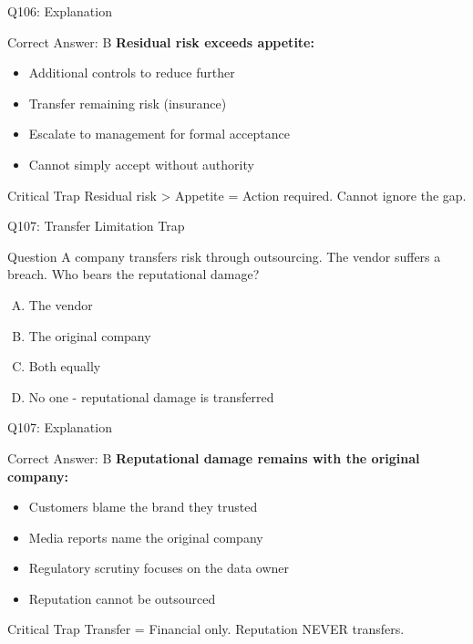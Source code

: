 \documentclass{beamer}
\begin{document}
	\begin{frame}{Q106: Explanation}
		\begin{block}{Correct Answer: B}
			\textbf{Residual risk exceeds appetite:}
			\begin{itemize}
				\item Additional controls to reduce further
				\item Transfer remaining risk (insurance)
				\item Escalate to management for formal acceptance
				\item Cannot simply accept without authority
			\end{itemize}
		\end{block}
		\begin{alertblock}{Critical Trap}
			Residual risk > Appetite = Action required.
			Cannot ignore the gap.
		\end{alertblock}
	\end{frame}
	
	\begin{frame}{Q107: Transfer Limitation Trap}
		\begin{block}{Question}
			A company transfers risk through outsourcing. The vendor suffers a breach. Who bears the reputational damage?
		\end{block}
		\begin{enumerate}[(A)]
			\item The vendor
			\item The original company
			\item Both equally
			\item No one - reputational damage is transferred
		\end{enumerate}
	\end{frame}
	
	\begin{frame}{Q107: Explanation}
		\begin{block}{Correct Answer: B}
			\textbf{Reputational damage remains with the original company:}
			\begin{itemize}
				\item Customers blame the brand they trusted
				\item Media reports name the original company
				\item Regulatory scrutiny focuses on the data owner
				\item Reputation cannot be outsourced
			\end{itemize}
		\end{block}
		\begin{alertblock}{Critical Trap}
			Transfer = Financial only.
			Reputation NEVER transfers.
		\end{alertblock}
	\end{frame}
	
\end{document}
